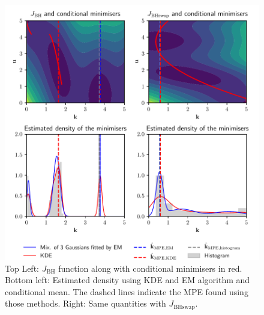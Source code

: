 \documentclass[preprint, 1p]{elsarticle}
\begin{document}
\begin{figure}
  \centering
  \includegraphics[width=12cm]{Figures/branin_side_66.pdf}
  \caption{Top Left:  $J_{\mathrm{BH}}$ function along with conditional minimisers in red. Bottom left: Estimated density using KDE and EM algorithm and conditional mean. The dashed lines indicate the MPE found using those methods. Right: Same quantities with $J_{\mathrm{BHswap}}$.}
\label{fig:contours}
\end{figure}
\end{document}
